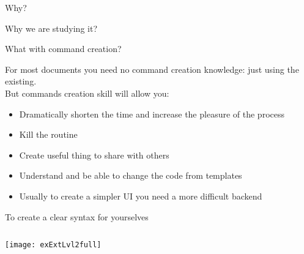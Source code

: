 \graphicspath{{sec01/images/}{sec01/code/}}
\lstset{inputpath=sec01/code/}

\begin{frame}{Why?}

\Huge\centering Why we are studying it?
     
\end{frame}

\begin{frame}{What with command creation?}\relax
    
    For most documents you need no command creation knowledge: just using the existing.\\[3ex]
    But commands creation skill will allow you:
    \begin{itemize}
        \item Dramatically shorten the time and increase the pleasure of the process
        \item Kill the routine
        \item Create useful thing to share with others
        \item Understand and be able to change the code from templates 
        \item Usually to create a simpler UI you need a more difficult backend
         
    \end{itemize}
     
\end{frame}

\begin{frame}{To create a clear syntax for yourselves}\relax

\inputminted[firstline=90, lastline=96]{latex}{sec01/code/exExtLvl2full.tex}

\texttt{[image: exExtLvl2full]}
     
\end{frame}
